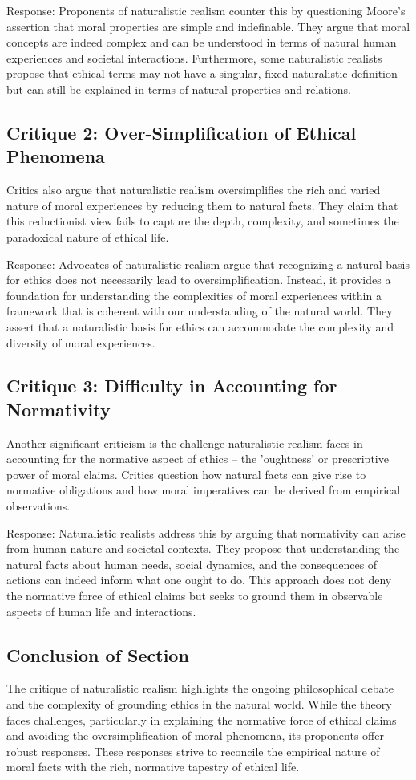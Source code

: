 \documentclass[12pt,a4paper]{article}
\begin{document}
Response: Proponents of naturalistic realism counter this by questioning Moore's assertion that moral properties are simple and indefinable. They argue that moral concepts are indeed complex and can be understood in terms of natural human experiences and societal interactions. Furthermore, some naturalistic realists propose that ethical terms may not have a singular, fixed naturalistic definition but can still be explained in terms of natural properties and relations.

\subsection{Critique 2: Over-Simplification of Ethical Phenomena}
Critics also argue that naturalistic realism oversimplifies the rich and varied nature of moral experiences by reducing them to natural facts. They claim that this reductionist view fails to capture the depth, complexity, and sometimes the paradoxical nature of ethical life.

Response: Advocates of naturalistic realism argue that recognizing a natural basis for ethics does not necessarily lead to oversimplification. Instead, it provides a foundation for understanding the complexities of moral experiences within a framework that is coherent with our understanding of the natural world. They assert that a naturalistic basis for ethics can accommodate the complexity and diversity of moral experiences.

\subsection{Critique 3: Difficulty in Accounting for Normativity}
Another significant criticism is the challenge naturalistic realism faces in accounting for the normative aspect of ethics – the 'oughtness' or prescriptive power of moral claims. Critics question how natural facts can give rise to normative obligations and how moral imperatives can be derived from empirical observations.

Response: Naturalistic realists address this by arguing that normativity can arise from human nature and societal contexts. They propose that understanding the natural facts about human needs, social dynamics, and the consequences of actions can indeed inform what one ought to do. This approach does not deny the normative force of ethical claims but seeks to ground them in observable aspects of human life and interactions.

\subsection{Conclusion of Section}
The critique of naturalistic realism highlights the ongoing philosophical debate and the complexity of grounding ethics in the natural world. While the theory faces challenges, particularly in explaining the normative force of ethical claims and avoiding the oversimplification of moral phenomena, its proponents offer robust responses. These responses strive to reconcile the empirical nature of moral facts with the rich, normative tapestry of ethical life.
\end{document}
